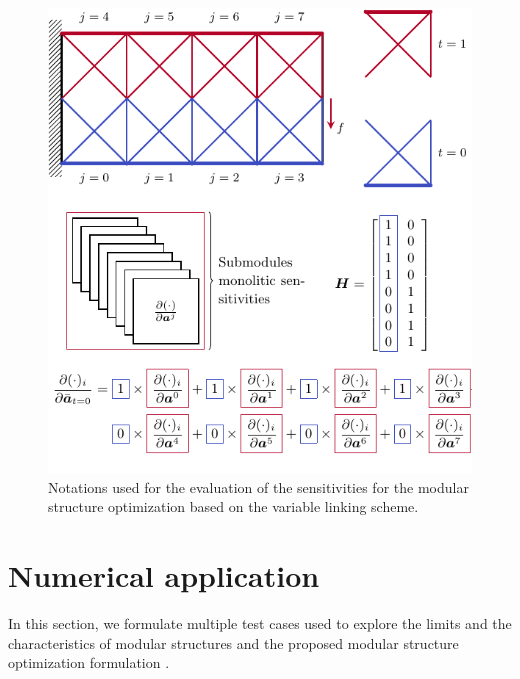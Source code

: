\begin{figure}
    \centering
    \includegraphics{figures/05_cellular_opt/00_modules_VL_grad/modules_grad.pdf}
    \caption{Notations used for the evaluation of the sensitivities for the modular structure optimization based on the variable linking scheme.}
    \label{fig:05_VL_grad}
\end{figure}

\section{Numerical application} \label{sec:05_02}
In this section, we formulate multiple test cases used to explore the limits and the characteristics of modular structures and the proposed modular structure optimization formulation .

